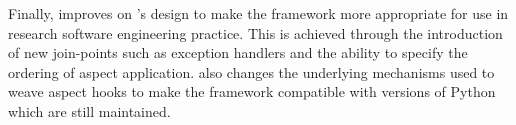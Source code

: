 Finally, \pdsfthree{} improves on \pydysofu{}'s design to make the framework more
appropriate for use in research software engineering practice. This is achieved
through the introduction of new join-points such as exception handlers and the
ability to specify the ordering of aspect application. \pdsfthree also changes
the underlying mechanisms used to weave aspect hooks to make the framework
compatible with versions of Python which are still maintained.



